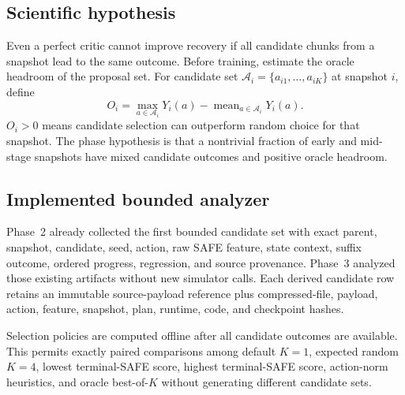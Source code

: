 
\subsection{Scientific hypothesis}

Even a perfect critic cannot improve recovery if all candidate chunks from a snapshot lead to the same outcome. Before training, estimate the oracle headroom of the proposal set. For candidate set $\mathcal{A}_i=\{a_{i1},\ldots,a_{iK}\}$ at snapshot $i$, define
\begin{equation}
  O_i = \max_{a\in\mathcal{A}_i}Y_i(a)-\operatorname{mean}_{a\in\mathcal{A}_i}Y_i(a).
\end{equation}
$O_i>0$ means candidate selection can outperform random choice for that snapshot. The phase hypothesis is that a nontrivial fraction of early and mid-stage snapshots have mixed candidate outcomes and positive oracle headroom.

\subsection{Implemented bounded analyzer}

Phase~2 already collected the first bounded candidate set with exact parent, snapshot, candidate, seed, action, raw SAFE feature, state context, suffix outcome, ordered progress, regression, and source provenance. Phase~3 analyzed those existing artifacts without new simulator calls. Each derived candidate row retains an immutable source-payload reference plus compressed-file, payload, action, feature, snapshot, plan, runtime, code, and checkpoint hashes.

Selection policies are computed offline after all candidate outcomes are available. This permits exactly paired comparisons among default $K=1$, expected random $K=4$, lowest terminal-SAFE score, highest terminal-SAFE score, action-norm heuristics, and oracle best-of-$K$ without generating different candidate sets.


